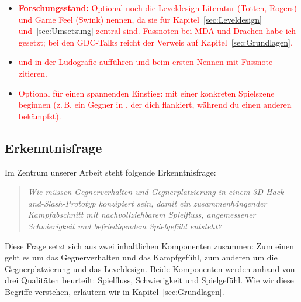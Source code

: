 \documentclass[../Main.tex]{subfiles}
\begin{document}
\begin{itemize}[leftmargin=1.5cm]
    \item \textcolor{red}{\textbf{Forschungsstand:} Optional noch die Leveldesign-Literatur (Totten, Rogers) und Game Feel (Swink) nennen, da sie für Kapitel~\ref{sec:Leveldesign} und~\ref{sec:Umsetzung} zentral sind. Fussnoten bei MDA und Drachen habe ich gesetzt; bei den GDC-Talks reicht der Verweis auf Kapitel~\ref{sec:Grundlagen}.}
    \item \textcolor{red}{ und  in der Ludografie aufführen und beim ersten Nennen mit Fussnote zitieren.}
    \item \textcolor{red}{Optional für einen spannenden Einstieg: mit einer konkreten Spielszene beginnen (z.\,B. ein Gegner in , der dich flankiert, während du einen anderen bekämpfst).}
\end{itemize}

\subsection{Erkenntnisfrage} \label{sec:Erkenntnisfrage}

Im Zentrum unserer Arbeit steht folgende Erkenntnisfrage:

\vspace{\baselineskip}

\begin{quote}
    \textit{Wie müssen Gegnerverhalten und Gegnerplatzierung in einem 3D-Hack-and-Slash-Prototyp konzipiert sein, damit ein zusammenhängender Kampfabschnitt mit nachvollziehbarem Spielfluss, angemessener Schwierigkeit und befriedigendem Spielgefühl entsteht?}
\end{quote}

\vspace{\baselineskip}

Diese Frage setzt sich aus zwei inhaltlichen Komponenten zusammen: Zum einen geht es um das Gegnerverhalten und das Kampfgefühl, zum anderen um die Gegnerplatzierung und das Leveldesign. Beide Komponenten werden anhand von drei Qualitäten beurteilt: Spielfluss, Schwierigkeit und Spielgefühl. Wie wir diese Begriffe verstehen, erläutern wir in Kapitel~\ref{sec:Grundlagen}.
\end{document}

